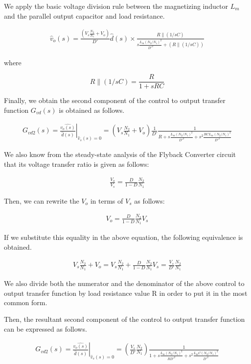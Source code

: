 We apply the basic voltage division rule between the magnetizing inductor $L_m$ and the parallel output capacitor and load resistance.

\begin{align}
    \hat{v}_o(s) = \frac{\left(V_s\frac{N_2}{N_1}+V_o \right)}{D'}\hat{d}(s)\times\frac{R \parallel (1/sC)}{s\frac{L_m(N_2/N_1)^2}{D'^2} + \left(R \parallel (1/sC)\right)}
\end{align}

where

$$ R \parallel (1/sC) = \frac{R}{1+sRC} $$

Finally, we obtain the second component of the control to output transfer function $G_{vd}(s)$ is obtained as follows.

\begin{align}
   \left. G_{vd2}(s) = \frac{\hat{v_o(s)}}{\hat{d}(s)}\right \vert_{\hat{v}_s(s) = 0} = \left(V_s\frac{N_2}{N_1} + V_o \right)\frac{1}{D'}\frac{1}{R+s\frac{L_m(N_2/N_1)^2}{D'^2}+s^2\frac{RCL_m(N_2/N_1)^2}{D'^2}}
\end{align}

We also know from the steady-state analysis of the Flyback Converter circuit that its voltage transfer ratio is given as follows:

\begin{align}
    \frac{V_o}{V_s} = \frac{D}{1-D}\frac{N_2}{N_1}
\end{align}

Then, we can rewrite the $V_o$ in terms of $V_s$ as follows:

\begin{align}
    V_o = \frac{D}{1-D}\frac{N_2}{N_1}V_s
\end{align}

If we substitute this equality in the above equation, the following equivalence is obtained.

\begin{align}
    V_s\frac{N_2}{N_1}+V_o =  V_s\frac{N_2}{N_1} + \frac{D}{1-D}\frac{N_2}{N_1}V_s = \frac{V_s}{D'}\frac{N_2}{N_1}
\end{align}

We also divide both the numerator and the denominator of the above control to output transfer function by load resistance value R in order to put it in the most common form.

Then, the resultant second component of the control to output transfer function can be expressed as follows.

\begin{align}
   \left. G_{vd2}(s) = \frac{\hat{v_o(s)}}{\hat{d}(s)}\right \vert_{\hat{v}_s(s) = 0} = \left(\frac{V_s}{D'}\frac{N_2}{N_1}\right)\frac{1}{1 + s\frac{L_m(N_2/N_1)^2}{RD'^2} + s^2\frac{L_mC(N_2/N_1)^2}{D'^2}} 
\end{align}

